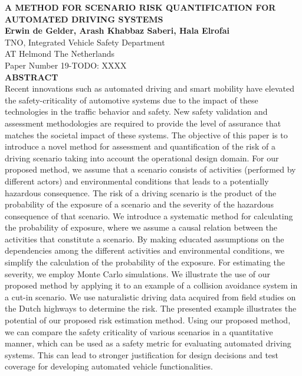 \documentclass[10pt,final,letterpaper,oneside,onecolumn]{article}
\newcommand{\todo}[1]{\color{red}TODO: #1\color{black}}
\begin{document}
\noindent \MakeTextUppercase{\textbf{A Method for Scenario Risk Quantification for Automated Driving Systems}}\\

\noindent \textbf{Erwin de Gelder, Arash Khabbaz Saberi, Hala Elrofai}\\
\noindent TNO, Integrated Vehicle Safety Department\\
 AT Helmond The Netherlands\\

\noindent Paper Number 19-\todo{XXXX}\\

\noindent \textbf{ABSTRACT}\\

\noindent Recent innovations such as automated driving and smart mobility have elevated the safety-criticality of automotive systems due to the impact of these technologies in the traffic behavior and safety. New safety validation and assessment methodologies are required to provide the level of assurance that matches the societal impact of these systems.
The objective of this paper is to introduce a novel method for assessment and quantification of the risk of a driving scenario taking into account the operational design domain. 
For our proposed method, we assume that a scenario consists of activities (performed by different actors) and environmental conditions that leads to a potentially hazardous consequence.
The risk of a driving scenario is the product of the probability of the exposure of a scenario and the severity of the hazardous consequence of that scenario.
We introduce a systematic method for calculating the probability of exposure, 
where we assume a causal relation between the activities that constitute a scenario. 
By making educated assumptions on the dependencies among the different activities and environmental conditions, 
we simplify the calculation of the probability of the exposure. 
For estimating the severity, we employ Monte Carlo simulations.
We illustrate the use of our proposed method by applying it to an example of a collision avoidance system in a cut-in scenario.	
We use naturalistic driving data acquired from field studies on the Dutch highways to determine the risk. 
The presented example illustrates the potential of our proposed risk estimation method. 
Using our proposed method, we can compare the safety criticality of various scenarios in a quantitative manner, which can be used as a safety metric for evaluating automated driving systems. 
This can lead to stronger justification for design decisions and test coverage for developing automated vehicle functionalities.


\pagebreak







\printbibliography[title=\hspace{7.5pt} References]
\end{document}

